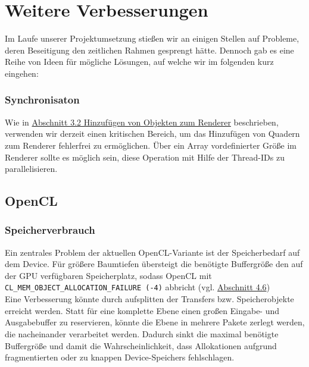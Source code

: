 \section{Weitere Verbesserungen}
\vspace{-0.25cm}
Im Laufe unserer Projektumsetzung stießen wir an einigen Stellen auf Probleme, deren Beseitigung den zeitlichen Rahmen gesprengt hätte.
Dennoch gab es eine Reihe von Ideen für mögliche Lösungen, auf welche wir im folgenden kurz eingehen: 

\vspace{-0.25cm}
\subsubsection*{Synchronisaton}
\vspace{-0.25cm}
Wie in \hyperref[3-2-rendering]{Abschnitt 3.2 Hinzufügen von Objekten zum Renderer} beschrieben, verwenden wir derzeit einen kritischen Bereich,
um das Hinzufügen von Quadern zum Renderer fehlerfrei zu ermöglichen. Über ein Array vordefinierter Größe im Renderer sollte es möglich
sein, diese Operation mit Hilfe der Thread-IDs zu parallelisieren. 

\subsection*{OpenCL}
\vspace{-0.25cm}
\subsubsection*{Speicherverbrauch}
\vspace{-0.25cm}
Ein zentrales Problem der aktuellen OpenCL-Variante ist der Speicherbedarf auf dem Device. Für größere Baumtiefen übersteigt die benötigte Buffergröße den auf der GPU
verfügbaren Speicherplatz, sodass OpenCL mit \texttt{CL\_MEM\_OBJECT\_ALLOCATION\_FAILURE (-4)} abbricht (vgl. \hyperref[openCL-Fehler]{Abschnitt 4.6})\\
Eine Verbesserung könnte durch aufsplitten der Transfers bzw. Speicherobjekte erreicht werden. Statt für eine komplette Ebene einen großen 
Eingabe- und Ausgabebuffer zu reservieren, könnte die Ebene in mehrere Pakete zerlegt werden, die nacheinander verarbeitet werden. 
Dadurch sinkt die maximal benötigte Buffergröße und damit die Wahrscheinlichkeit, dass Allokationen aufgrund fragmentierten oder zu
knappen Device-Speichers fehlschlagen.

\vspace{-0.25cm}
